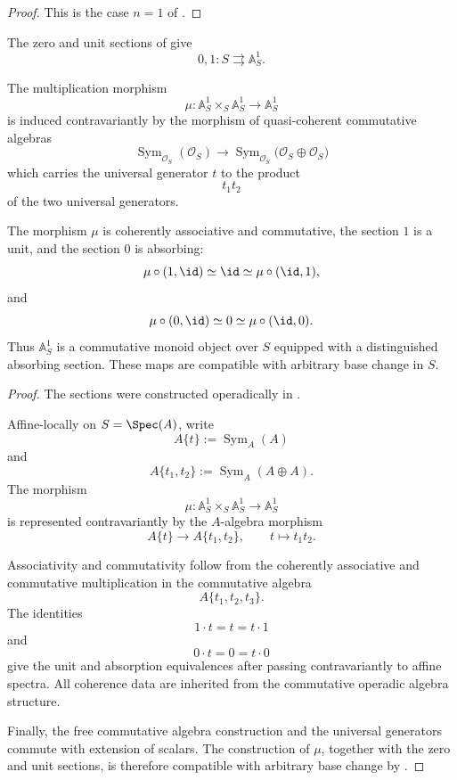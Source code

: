 \begin{proof}
This is the case $n=1$ of
.
\end{proof}

\begin{construction}
\label{con:affine-line-interval-maps}
The zero and unit sections of
 give
\[
    0,1
    \colon
    S
    \rightrightarrows
    \mathbb A^1_S.
\]

The multiplication morphism
\[
    \mu
    \colon
    \mathbb A^1_S
    \times_S
    \mathbb A^1_S
    \longrightarrow
    \mathbb A^1_S
\]
is induced contravariantly by the morphism of quasi-coherent
commutative algebras
\[
    \operatorname{Sym}_{\mathcal O_S}(\mathcal O_S)
    \longrightarrow
    \operatorname{Sym}_{\mathcal O_S}
    \bigl(
        \mathcal O_S\oplus\mathcal O_S
    \bigr)
\]
which carries the universal generator \(t\) to the product
\[
    t_1t_2
\]
of the two universal generators.

The morphism \(\mu\) is coherently associative and commutative, the
section \(1\) is a unit, and the section \(0\) is absorbing:
\[
    \mu\circ(1,\id)
    \simeq
    \id
    \simeq
    \mu\circ(\id,1),
\]
and
\[
    \mu\circ(0,\id)
    \simeq
    0
    \simeq
    \mu\circ(\id,0).
\]
Thus \(\mathbb A^1_S\) is a commutative monoid object over \(S\)
equipped with a distinguished absorbing section. These maps are
compatible with arbitrary base change in \(S\).
\end{construction}

\begin{proof}
The sections were constructed operadically in
.

Affine-locally on \(S=\Spec(A)\), write
\[
    A\{t\}
    :=
    \operatorname{Sym}_A(A)
\]
and
\[
    A\{t_1,t_2\}
    :=
    \operatorname{Sym}_A(A\oplus A).
\]
The morphism
\[
    \mu
    \colon
    \mathbb A^1_S\times_S\mathbb A^1_S
    \longrightarrow
    \mathbb A^1_S
\]
is represented contravariantly by the \(A\)-algebra morphism
\[
    A\{t\}
    \longrightarrow
    A\{t_1,t_2\},
    \qquad
    t
    \longmapsto
    t_1t_2.
\]

Associativity and commutativity follow from the coherently associative
and commutative multiplication in the commutative algebra
\[
    A\{t_1,t_2,t_3\}.
\]
The identities
\[
    1\cdot t=t=t\cdot1
\]
and
\[
    0\cdot t=0=t\cdot0
\]
give the unit and absorption equivalences after passing
contravariantly to affine spectra. All coherence data are inherited
from the commutative operadic algebra structure.

Finally, the free commutative algebra construction and the universal
generators commute with extension of scalars. The construction of
\(\mu\), together with the zero and unit sections, is therefore
compatible with arbitrary base change by
.
\end{proof}

